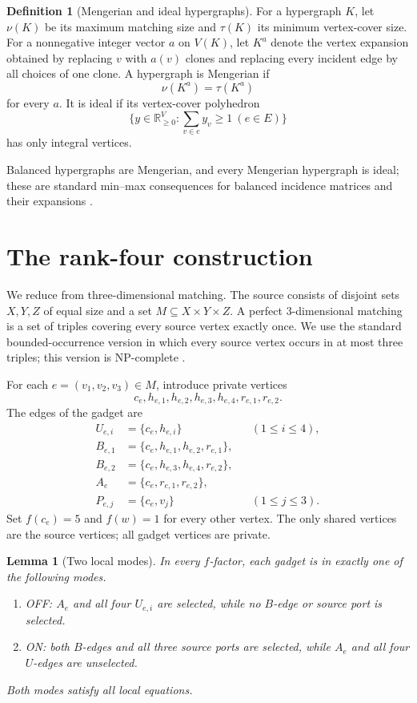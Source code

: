 \documentclass[11pt]{article}
\newtheorem{lemma}[theorem]{Lemma}
\theoremstyle{definition}
\newtheorem{definition}[theorem]{Definition}
\theoremstyle{remark}
\begin{document}
\begin{definition}[Mengerian and ideal hypergraphs]
For a hypergraph $K$, let $\nu(K)$ be its maximum matching size and
$\tau(K)$ its minimum vertex-cover size. For a nonnegative integer vector
$a$ on $V(K)$, let $K^a$ denote the vertex expansion obtained by replacing
$v$ with $a(v)$ clones and replacing every incident edge by all choices of
one clone. A hypergraph is Mengerian if
\[
\nu(K^a)=\tau(K^a)
\]
for every $a$. It is ideal if its vertex-cover polyhedron
\[
\{y\in\mathbb R_{\ge0}^{V}:\sum_{v\in e}y_v\ge1\ (e\in E)\}
\]
has only integral vertices.
\end{definition}

Balanced hypergraphs are Mengerian, and every Mengerian hypergraph is ideal;
these are standard min--max consequences for balanced incidence matrices
and their expansions \cite{BS17,Beckenbach2019}.

\section{The rank-four construction}

We reduce from three-dimensional matching. The source consists of disjoint
sets $X,Y,Z$ of equal size and a set
$M\subseteq X\times Y\times Z$. A perfect 3-dimensional matching is a set
of triples covering every source vertex exactly once. We use the standard
bounded-occurrence version in which every source vertex occurs in at most
three triples; this version is NP-complete \cite{GJ79}.

For each $e=(v_1,v_2,v_3)\in M$, introduce private vertices
\[
c_e,h_{e,1},h_{e,2},h_{e,3},h_{e,4},r_{e,1},r_{e,2}.
\]
The edges of the gadget are
\begin{align*}
U_{e,i}&=\{c_e,h_{e,i}\} &&(1\le i\le4),\\
B_{e,1}&=\{c_e,h_{e,1},h_{e,2},r_{e,1}\},\\
B_{e,2}&=\{c_e,h_{e,3},h_{e,4},r_{e,2}\},\\
A_e&=\{c_e,r_{e,1},r_{e,2}\},\\
P_{e,j}&=\{c_e,v_j\} &&(1\le j\le3).
\end{align*}
Set $f(c_e)=5$ and $f(w)=1$ for every other vertex. The only shared
vertices are the source vertices; all gadget vertices are private.

\begin{lemma}[Two local modes]
In every $f$-factor, each gadget is in exactly one of the following modes.
\begin{enumerate}[label=(\roman*)]
\item OFF: $A_e$ and all four $U_{e,i}$ are selected, while no $B$-edge or
source port is selected.
\item ON: both $B$-edges and all three source ports are selected, while
$A_e$ and all four $U$-edges are unselected.
\end{enumerate}
Both modes satisfy all local equations.
\end{lemma}
\end{document}

